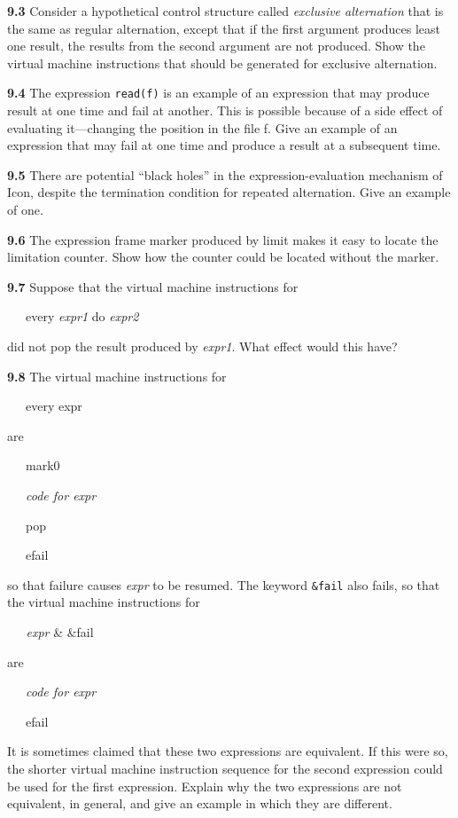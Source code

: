 \textbf{9.3} Consider a hypothetical control structure called
\textit{exclusive alternation} that is the same as regular
alternation, except that if the first argument produces least one
result, the results from the second argument are not produced. Show
the virtual machine instructions that should be generated for
exclusive alternation.

\textbf{9.4} The expression \texttt{read(f)} is an example of an expression
that may produce result at one time and fail at another. This is
possible because of a side effect of evaluating it---changing the
position in the file f. Give an example of an expression that may fail
at one time and produce a result at a subsequent time.

\textbf{9.5} There are potential ``black holes'' in
the expression-evaluation mechanism of Icon, despite the termination
condition for repeated alternation. Give an example of one.

\textbf{9.6} The expression frame marker produced by limit makes it easy to
locate the limitation counter. Show how the counter could be located
without the marker.

\textbf{9.7} Suppose that the virtual machine instructions for

{\ttfamily\mdseries
\ \ \ every \textit{expr1} do \textit{expr2}}

\noindent did not pop the result produced by \textit{expr1}. What
effect would this have?

\textbf{9.8} The virtual machine instructions for

{\ttfamily\mdseries
\ \ \ every expr}

are

{\ttfamily\mdseries
\ \ \ mark0}

{\ttfamily\mdseries
\ \ \ \textit{code for expr}}

{\ttfamily\mdseries
\ \ \ pop}

{\ttfamily\mdseries
\ \ \ efail}

\noindent so that failure causes \textit{expr} to be resumed. The
keyword \texttt{\&fail} also fails, so that the virtual machine
instructions for

{\ttfamily\mdseries
\textit{\ \ \ expr }\& \&fail}

are

{\ttfamily\mdseries
\ \ \ \textit{code for expr}}

{\ttfamily\mdseries
\ \ \ efail}

It is sometimes claimed that these two expressions are equivalent. If
this were so, the shorter virtual machine instruction sequence for the
second expression could be used for the first expression. Explain why
the two expressions are not equivalent, in general, and give an
example in which they are different.

